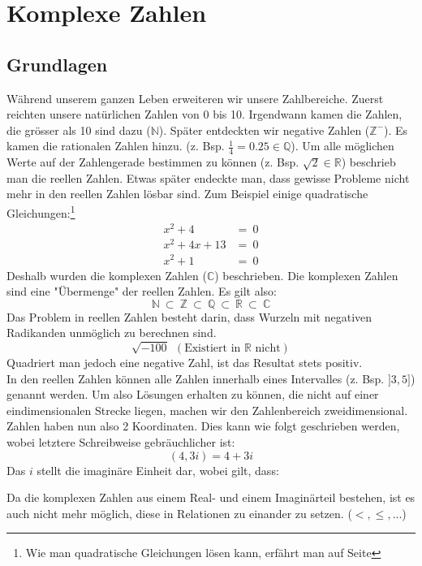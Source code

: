 \documentclass[12pt,a4paper]{scrbook}
\begin{document}
\chapter{Komplexe Zahlen}
\section{Grundlagen}
Während unserem ganzen Leben erweiteren wir unsere Zahlbereiche. Zuerst
reichten unsere natürlichen Zahlen von 0 bis 10. Irgendwann kamen die Zahlen,
die grösser als 10 sind dazu ($\mathbb{N}$). Später entdeckten wir
negative Zahlen ($\mathbb{Z}^-$). Es kamen die rationalen Zahlen hinzu.
(z. Bsp. $\frac{1}{4} = 0.25 \in \mathbb{Q}$). Um alle möglichen Werte auf
der Zahlengerade bestimmen zu können (z. Bsp. $\sqrt{2} \in \mathbb{R}$)
beschrieb man die reellen Zahlen. Etwas später endeckte man, dass
gewisse Probleme nicht mehr in den reellen Zahlen lösbar sind.
Zum Beispiel einige quadratische Gleichungen:\footnote{Wie man quadratische Gleichungen lösen kann,
erfährt man auf Seite \pageref{quadratische_gleichungen}}
\begin{eqnarray*}
x^2+4 & = ~ 0\\
x^2+4x+13 & = ~ 0\\
x^2+1 & = ~ 0
\end{eqnarray*}
Deshalb wurden die komplexen Zahlen ($\mathbb{C}$) beschrieben. Die komplexen
Zahlen sind eine "Übermenge" der reellen Zahlen. Es gilt also:
\[\mathbb{N} ~ \subset ~ \mathbb{Z} ~ \subset ~ \mathbb{Q} ~ \subset ~ \mathbb{R} ~ \subset ~ \mathbb{C}\]
Das Problem in reellen Zahlen besteht darin, dass Wurzeln mit negativen
Radikanden unmöglich zu berechnen sind.
\[\sqrt{-100} ~~ (\text{Existiert in }\mathbb{R} \text{ nicht})\]
Quadriert man jedoch eine negative Zahl, ist das Resultat stets positiv.\\
In den reellen Zahlen können alle Zahlen innerhalb eines Intervalles (z. Bsp.
$]3, 5]$) genannt werden. Um also Lösungen erhalten zu können, die nicht auf
einer eindimensionalen Strecke liegen, machen wir den Zahlenbereich zweidimensional.
Zahlen haben nun also 2 Koordinaten. Dies kann wie folgt geschrieben werden, wobei
letztere Schreibweise gebräuchlicher ist:
\[(4, 3i) = 4 + 3i\]
Das $i$ stellt die imaginäre Einheit dar, wobei gilt, dass:
\begin{center}
\fbox{\parbox{4cm}{\[i^2 = -1\]}}
\end{center}
Da die komplexen Zahlen aus einem Real- und einem Imaginärteil bestehen, ist es auch nicht mehr möglich,
diese in Relationen zu einander zu setzen. ($<, \leq, ...$)
\end{document}
